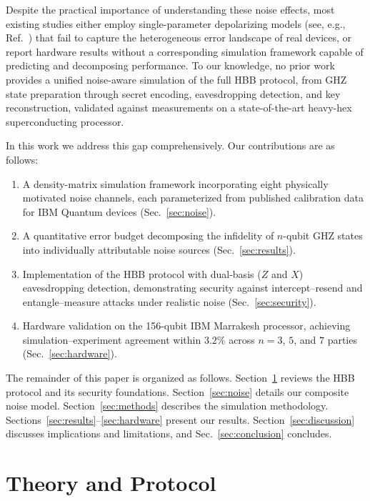 \documentclass[aip, amsmath, amssymb, preprint, longbibliography]{revtex4-2}
\begin{document}
Despite the practical importance of understanding these noise effects, most
existing studies either employ single-parameter depolarizing
models (see, e.g., Ref.~\cite{NielsenChuang2010}) that fail to capture the heterogeneous
error landscape of real devices, or report hardware results without a
corresponding simulation framework capable of predicting and decomposing
performance. To our knowledge, no prior work provides a unified noise-aware
simulation of the full HBB protocol, from GHZ state preparation through
secret encoding, eavesdropping detection, and key
reconstruction, validated against measurements on a state-of-the-art
heavy-hex superconducting processor.

In this work we address this gap comprehensively. Our contributions are as
follows:
\begin{enumerate}
\item A density-matrix simulation framework incorporating eight
      physically motivated noise channels, each parameterized from
      published calibration data for IBM Quantum devices (Sec.~\ref{sec:noise}).
\item A quantitative error budget decomposing the infidelity of $n$-qubit
      GHZ states into individually attributable noise sources
      (Sec.~\ref{sec:results}).
\item Implementation of the HBB protocol with dual-basis ($Z$ and $X$)
      eavesdropping detection, demonstrating security against
      intercept--resend and entangle--measure attacks under realistic
      noise (Sec.~\ref{sec:security}).
\item Hardware validation on the 156-qubit IBM Marrakesh processor,
      achieving simulation--experiment agreement within $3.2\%$ across
      $n=3$, $5$, and $7$ parties (Sec.~\ref{sec:hardware}).
\end{enumerate}

The remainder of this paper is organized as follows.
Section~\ref{sec:theory} reviews the HBB protocol and its security
foundations. Section~\ref{sec:noise} details our composite noise model.
Section~\ref{sec:methods} describes the simulation methodology.
Sections~\ref{sec:results}--\ref{sec:hardware} present our results.
Section~\ref{sec:discussion} discusses implications and limitations, and
Sec.~\ref{sec:conclusion} concludes.

\section{Theory and Protocol}\label{sec:theory}
\end{document}
